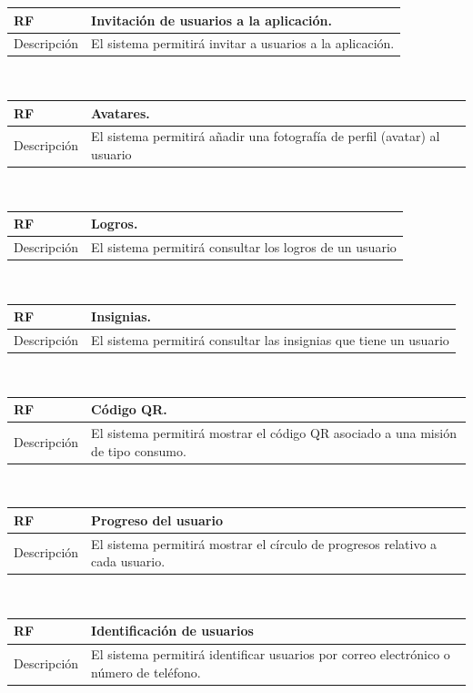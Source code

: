 \documentclass[twoside]{report}
\newcommand\addrow[2]{#1 &#2\\ }
\newcommand\addheading[2]{#1 &#2\\ \hline}
\newcommand\tabularhead{\begin{tabular}{lp{0.7\textwidth}}
\hline
}
\newenvironment{req}{\tabularhead}
{\hline\end{tabular}}
\begin{document}
\begin{req}
	\addheading{\textbf{RF\arabic{functionalRequirements}}}{Invitación de usuarios a la aplicación.}
	\addrow{Descripción}{El sistema permitirá invitar a usuarios a la aplicación.}
\end{req}\\

\begin{req}
	\addheading{\textbf{RF\arabic{functionalRequirements}}}{Avatares.}
	\addrow{Descripción}{El sistema permitirá añadir una fotografía de perfil (avatar) al usuario}
\end{req}\\

\begin{req}
	\addheading{\textbf{RF\arabic{functionalRequirements}}}{Logros.}
	\addrow{Descripción}{El sistema permitirá consultar los logros de un usuario}
\end{req}\\

\begin{req}
	\addheading{\textbf{RF\arabic{functionalRequirements}}}{Insignias.}
	\addrow{Descripción}{El sistema permitirá consultar las insignias que tiene un usuario}
\end{req}\\

\begin{req}
	\addheading{\textbf{RF\arabic{functionalRequirements}}}{Código QR.}
	\addrow{Descripción}{El sistema permitirá mostrar el código QR asociado a una misión de tipo consumo.}
\end{req}\\

\begin{req}
	\addheading{\textbf{RF\arabic{functionalRequirements}}}{Progreso del usuario}
	\addrow{Descripción}{El sistema permitirá mostrar el círculo de progresos relativo a cada usuario.}
\end{req}\\

\begin{req}
	\addheading{\textbf{RF\arabic{functionalRequirements}}}{Identificación de usuarios}
	\addrow{Descripción}{El sistema permitirá identificar usuarios por correo electrónico o número de teléfono.}
\end{req}\\
\end{document}
